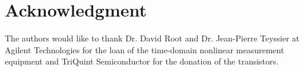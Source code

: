 \documentclass[journal]{IEEEtran}
\begin{document}
\section*{Acknowledgment}


The authors would like to thank Dr. David Root and Dr. Jean-Pierre Teyssier at Agilent Technologies for the loan of the time-domain nonlinear measurement equipment and TriQuint Semiconductor for the donation of the transistors. 




%


\end{document}
